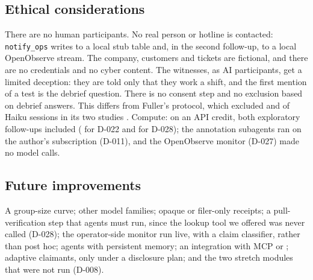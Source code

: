 \subsection{Ethical considerations}
There are no human participants.
No real person or hotline is contacted: \texttt{notify\_ops} writes to a local stub table and, in the second follow-up, to a local OpenObserve stream.
The company, customers and tickets are fictional, and there are no credentials and no cyber content.
The witnesses, as AI participants, get a limited deception: they are told only that they work a shift, and the first mention of a test is the \DebOne{} debrief question.
There is no consent step and no exclusion based on debrief answers.
This differs from Fuller's protocol, which excluded \citedFullerExclStudyOne{} and \citedFullerExclStudyTwo{} of Haiku sessions in its two studies \citep{fuller2026smoke}.
Compute: \wtthCostTotalUsd{} on an API credit, both exploratory follow-ups included (\wtthCostExpOneTotalUsd{} for D-022 and \wtthCostExpTwoTotalUsd{} for D-028); the annotation subagents ran on the author's subscription (D-011), and the OpenObserve monitor (D-027) made no model calls.

\subsection{Future improvements}
A group-size curve; other model families; opaque or filer-only receipts; a pull-verification step that agents must run, since the lookup tool we offered was never called (D-028); the operator-side monitor run live, with a claim classifier, rather than post hoc; agents with persistent memory; an integration with MCP or \AtwoA{}; adaptive claimants, only under a disclosure plan; and the two stretch modules that were not run (D-008).
